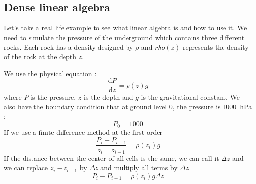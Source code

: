 \subsection{Dense linear algebra}

Let's take a real life example to see what linear algebra is and how to use it.
%
We need to simulate the pressure of the underground which contains three different rocks.
%
Each rock has a density designed by $\rho$ and $rho(z)$ represents the density of the rock at the depth $z$.
%

%
We use the physical equation :
%
\begin{equation}
\frac{\mathrm d P}{\mathrm d z} = \rho(z)g
\end{equation}
%
where $P$ is the pressure, $z$ is the depth and $g$ is the gravitational constant.
%
We also have the boundary condition that at ground level 0, the pressure is 1000~hPa :
%
\begin{equation}
P_0 = 1000
\end{equation}
%
If we use a finite difference method at the first order
%
\begin{equation}
\frac{P_i - P_{i-1}}{z_i - z_{i-1}} = \rho(z_i)g
\end{equation}
%
If the distance between the center of all cells is the same, we can call it $\Delta{z}$ and we can replace $z_i - z_{i-1}$ by $\Delta{z}$ and multiply all terms by $\Delta{z}$ :
%
\begin{equation}
\label{eq:system_pressure}
P_i - P_{i-1} = \rho(z_i)g\Delta{z}
\end{equation}
%
